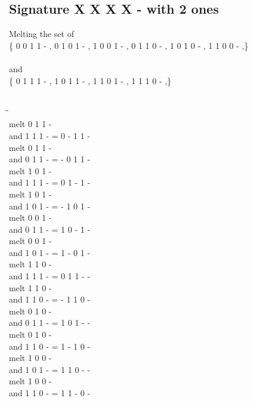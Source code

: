 \documentclass{article}
\begin{document}
\subsection{Signature X X X X - with 2 ones}
Melting the set of\\
\{ 0  0  1  1  - , 0  1  0  1  - , 1  0  0  1  - , 0  1  1  0  - , 1  0  1  0  - , 1  1  0  0  - ,\}\\\\
and\\
\{ 0  1  1  1  - , 1  0  1  1  - , 1  1  0  1  - , 1  1  1  0  - ,\}\\\\
\begin{tabbing}
\hspace{3cm}\=\hspace{3cm}\=\hspace{3cm}\\[1cm]
melt  0  1  1  - \\
and  1  1  1  - \>
 =  0  -  1  1  - \\[1mm]
melt  0  1  1  - \\
and  0  1  1  - \>
 =  -  0  1  1  - \\[1mm]
melt  1  0  1  - \\
and  1  1  1  - \>
 =  0  1  -  1  - \\[1mm]
melt  1  0  1  - \\
and  1  0  1  - \>
 =  -  1  0  1  - \\[1mm]
melt  0  0  1  - \\
and  0  1  1  - \>
 =  1  0  -  1  - \\[1mm]
melt  0  0  1  - \\
and  1  0  1  - \>
 =  1  -  0  1  - \\[1mm]
melt  1  1  0  - \\
and  1  1  1  - \>
 =  0  1  1  -  - \\[1mm]
melt  1  1  0  - \\
and  1  1  0  - \>
 =  -  1  1  0  - \\[1mm]
melt  0  1  0  - \\
and  0  1  1  - \>
 =  1  0  1  -  - \\[1mm]
melt  0  1  0  - \\
and  1  1  0  - \>
 =  1  -  1  0  - \\[1mm]
melt  1  0  0  - \\
and  1  0  1  - \>
 =  1  1  0  -  - \\[1mm]
melt  1  0  0  - \\
and  1  1  0  - \>
 =  1  1  -  0  - \\[1mm]
\end{tabbing}
\newpage
\end{document}
